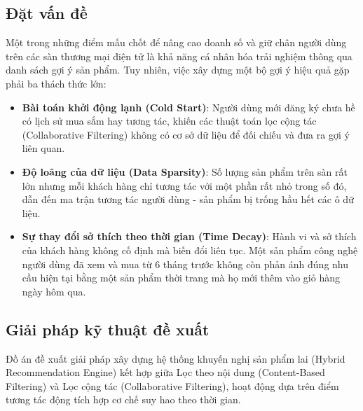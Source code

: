 \documentclass[../DoAn.tex]{subfiles}
\begin{document}
\subsection{Đặt vấn đề}
Một trong những điểm mấu chốt để nâng cao doanh số và giữ chân người dùng trên các sàn thương mại điện tử là khả năng cá nhân hóa trải nghiệm thông qua danh sách gợi ý sản phẩm. Tuy nhiên, việc xây dựng một bộ gợi ý hiệu quả gặp phải ba thách thức lớn:
\begin{itemize}
    \item \textbf{Bài toán khởi động lạnh (Cold Start)}: Người dùng mới đăng ký chưa hề có lịch sử mua sắm hay tương tác, khiến các thuật toán lọc cộng tác (Collaborative Filtering) không có cơ sở dữ liệu để đối chiếu và đưa ra gợi ý liên quan.
    \item \textbf{Độ loãng của dữ liệu (Data Sparsity)}: Số lượng sản phẩm trên sàn rất lớn nhưng mỗi khách hàng chỉ tương tác với một phần rất nhỏ trong số đó, dẫn đến ma trận tương tác người dùng - sản phẩm bị trống hầu hết các ô dữ liệu.
    \item \textbf{Sự thay đổi sở thích theo thời gian (Time Decay)}: Hành vi và sở thích của khách hàng không cố định mà biến đổi liên tục. Một sản phẩm công nghệ người dùng đã xem và mua từ 6 tháng trước không còn phản ánh đúng nhu cầu hiện tại bằng một sản phẩm thời trang mà họ mới thêm vào giỏ hàng ngày hôm qua.
\end{itemize}

\subsection{Giải pháp kỹ thuật đề xuất}
Đồ án đề xuất giải pháp xây dựng hệ thống khuyến nghị sản phẩm lai (Hybrid Recommendation Engine) kết hợp giữa Lọc theo nội dung (Content-Based Filtering) và Lọc cộng tác (Collaborative Filtering), hoạt động dựa trên điểm tương tác động tích hợp cơ chế suy hao theo thời gian.
\end{document}
